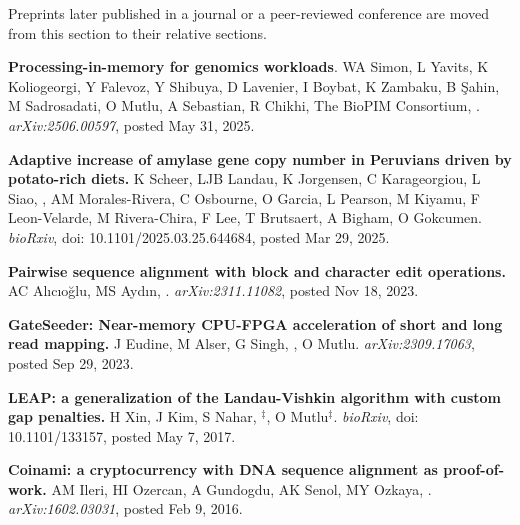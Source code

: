 \small{
Preprints later published in a journal or a peer-reviewed conference are moved from this section to their relative sections.
}


\vspace{-.2cm}
    {\bf Processing-in-memory for genomics workloads}.
    WA Simon, L Yavits, K Koliogeorgi, Y Falevoz, Y Shibuya, D Lavenier, I Boybat, K Zambaku, B Şahin, M Sadrosadati, O Mutlu, A Sebastian, R Chikhi, The BioPIM Consortium, \calkan{}.
    {\it arXiv:2506.00597}, posted May 31, 2025.

\vspace{-.2cm}
    {\bf Adaptive increase of amylase gene copy number in Peruvians driven by potato-rich diets.}
     K Scheer,  LJB Landau,  K Jorgensen,  C Karageorgiou, L Siao,  \calkan{}, AM Morales-Rivera, C Osbourne,  O Garcia,  L Pearson,  M Kiyamu,  F Leon-Velarde,  M Rivera-Chira,  F Lee,  T Brutsaert,  A Bigham,  O Gokcumen.
     {\it bioRxiv}, doi: 10.1101/2025.03.25.644684, posted Mar 29, 2025.

\vspace{-.2cm}
    {\bf Pairwise sequence alignment with block and character edit operations.} 
    AC Alıcıoğlu, MS Aydın, \calkan{}.
    {\it arXiv:2311.11082}, posted Nov 18, 2023.


\vspace{-.2cm}
{\bf GateSeeder: Near-memory CPU-FPGA acceleration of short and long read mapping.}
J Eudine, M Alser, G Singh, \calkan{}, O Mutlu.
{\it arXiv:2309.17063}, posted Sep 29, 2023.


\vspace{-.2cm}
 {\bf LEAP: a generalization of the Landau-Vishkin algorithm with custom gap penalties.}
 H Xin, J Kim, S Nahar, \calkan{}$^\ddag$, O Mutlu$^\ddag$.
{\it bioRxiv}, doi: 10.1101/133157, posted May 7, 2017.

\vspace{-.2cm}
 {\bf  Coinami: a cryptocurrency with DNA sequence alignment as proof-of-work.}
 AM Ileri, HI Ozercan, A Gundogdu, AK Senol, MY Ozkaya, \calkan{}.
{\it arXiv:1602.03031}, posted Feb 9, 2016.


\vspace{-.4cm}

